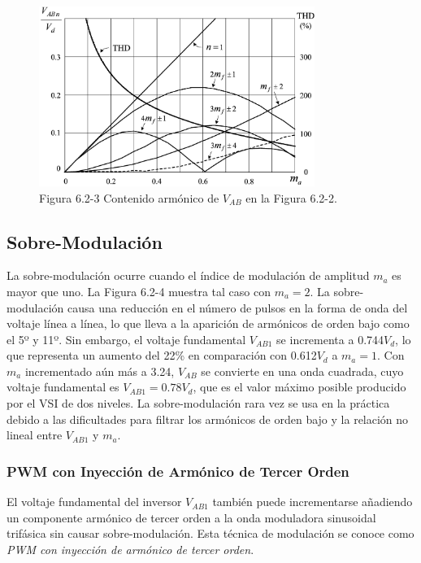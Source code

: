 \documentclass[letterpaper,12pt]{article}
\begin{document}
\begin{figure}[h]
	\centering
	\includegraphics[width=0.8\textwidth]{graficos/img80.jpg}
	\caption{Figura 6.2-3 Contenido armónico de $V_{AB}$ en la Figura 6.2-2.}
\end{figure}
\FloatBarrier

\subsection{Sobre-Modulación}
La sobre-modulación ocurre cuando el índice de modulación de amplitud $m_a$ es mayor que uno. La Figura 6.2-4 muestra tal caso con $m_a = 2$. La sobre-modulación causa una reducción en el número de pulsos en la forma de onda del voltaje línea a línea, lo que lleva a la aparición de armónicos de orden bajo como el 5º y 11º. Sin embargo, el voltaje fundamental $V_{AB1}$ se incrementa a 0.744$V_d$, lo que representa un aumento del 22\% en comparación con 0.612$V_d$ a $m_a = 1$. Con $m_a$ incrementado aún más a 3.24, $V_{AB}$ se convierte en una onda cuadrada, cuyo voltaje fundamental es $V_{AB1} = 0.78V_d$, que es el valor máximo posible producido por el VSI de dos niveles. La sobre-modulación rara vez se usa en la práctica debido a las dificultades para filtrar los armónicos de orden bajo y la relación no lineal entre $V_{AB1}$ y $m_a$.

\subsubsection{PWM con Inyección de Armónico de Tercer Orden}
El voltaje fundamental del inversor $V_{AB1}$ también puede incrementarse añadiendo un componente armónico de tercer orden a la onda moduladora sinusoidal trifásica sin causar sobre-modulación. Esta técnica de modulación se conoce como \textit{PWM con inyección de armónico de tercer orden}.
\end{document}
